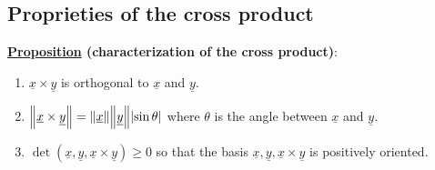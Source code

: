 \documentclass[10pt]{extarticle}
\begin{document}
\subsection{Proprieties of the cross product}

\textbf{\underline{Proposition} (characterization of the cross product)}:

\begin{enumerate}
    \item $\underline{x} \times \underline{y}$ is orthogonal to $\underline{x}$ and $\underline{y}$.
    \item $\norm{\underline{x} \times \underline{y}} = \norm{\underline{x}} \norm {\underline{y}} \abs{\sin \theta}$
          where $\theta$ is the angle between $\underline{x}$ and $\underline{y}$.
    \item $\det (\underline{x}, \underline{y}, \underline{x} \times \underline{y}) \geq 0$
          so that the basis $\underline{x}, \underline{y}, \underline{x} \times \underline{y}$ is positively oriented.
\end{enumerate}
\end{document}
